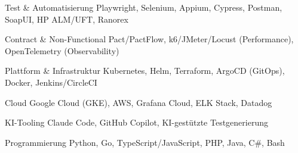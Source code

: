 
\begin{cvskills}

	\cvskill
	{Test \& Automatisierung}
    {Playwright, Selenium, Appium, Cypress, Postman, SoapUI, HP ALM/UFT, Ranorex}

	\cvskill
	{Contract \& Non-Functional}
    {Pact/PactFlow, k6/JMeter/Locust (Performance), OpenTelemetry (Observability)}

    \cvskill
	{Plattform \& Infrastruktur}
    {Kubernetes, Helm, Terraform, ArgoCD (GitOps), Docker, Jenkins/CircleCI}

	\cvskill
    {Cloud}
    {Google Cloud (GKE), AWS, Grafana Cloud, ELK Stack, Datadog}

    \cvskill
	{KI-Tooling}
    {Claude Code, GitHub Copilot, KI-gestützte Testgenerierung}

	\cvskill
	{Programmierung}
    {Python, Go, TypeScript/JavaScript, PHP, Java, C\#, Bash}

\end{cvskills}
